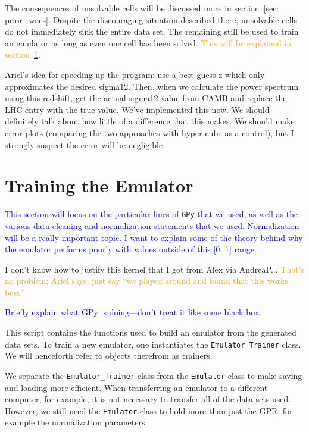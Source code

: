 
The consequences of unsolvable cells will be discussed more in
section~\ref{sec: prior_woes}. Despite the discouraging situation described 
there,
unsolvable cells do not immediately sink the entire data set. The remaining
still be used to train an emulator as long as even one cell has been solved.
\textcolor{orange}{This will be explained in section~\ref{sec: train_emu}}.


Ariel’s idea for speeding up the program: use a best-guess z which only approximates the desired sigma12. Then, when we calculate the power spectrum using this redshift, get the actual sigma12 value from CAMB and replace the LHC entry with the true value.
We’ve implemented this now. We should definitely talk about how little of a difference that this makes. We should make error plots (comparing the two approaches with hyper cube as a control), but I strongly suspect the error will be negligible.


\section{Training the Emulator}
\label{sec: train_emu}


\textcolor{blue}{This section will focus on the particular lines of}
\verb|GPy| \textcolor{blue}{that we used, as well
as the various data-cleaning and normalization statements that we used.
Normalization will be a really important topic. I want to explain some of
the theory behind why the emulator performs poorly with values outside of this
[0, 1] range.}

I don't know how to justify this kernel that I got from Alex via AndreaP...
\textcolor{orange}{That's no problem; Ariel says, just say ``we played around
and found that this works best.''}

\textcolor{blue}{Briefly explain what GPy is doing—don’t treat it like some black box.}

This script contains the functions used to build an emulator from the 
generated data sets. To train a new emulator, one instantiates the
\verb|Emulator_Trainer| class. We will henceforth refer to objects therefrom 
as trainers.

We separate the \verb|Emulator_Trainer| class from the \verb|Emulator| class
to make saving and loading more efficient. When transferring an emulator to a
different computer, for example, it is not necessary to transfer all of the
data sets used.
However, we still need the \verb|Emulator| class to hold more than just the 
GPR, for example the normalization parameters.

